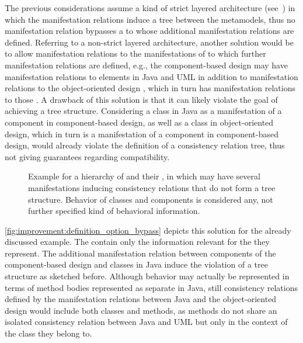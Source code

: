 The previous considerations assume a kind of strict layered architecture (see~\cite{buschmann1996PatternsArchitecture-Book}) in which the manifestation relations induce a tree between the metamodels, thus no manifestation relation bypasses a \conceptmetamodel to whose \commonalities additional manifestation relations are defined.
Referring to a non-strict layered architecture, another solution would be to allow manifestation relations to the manifestations of \conceptmetamodels to which further manifestation relations are defined, e.g., the component-based design \commonalities may have manifestation relations to elements in Java and \gls{UML} in addition to manifestation relations to the object-oriented design \conceptmetamodels, which in turn has manifestation relations to those \concretemetamodels.
A drawback of this solution is that it can likely violate the goal of achieving a tree structure.
Considering a class in Java as a manifestation of a component in component-based design, as well as a class in object-oriented design, which in turn is a manifestation of a component in component-based design, would already violate the definition of a consistency relation tree, thus not giving guarantees regarding compatibility.

\begin{figure}
    \centering
    
    \caption[\Commonalities with multiple manifestations]{Example for a hierarchy of \conceptmetamodels and their \commonalities, in which \commonalities may have several manifestations inducing consistency relations that do not form a tree structure. Behavior of classes and components is considered any, not further specified kind of behavioral information.}
    \label{fig:improvement:definition_option_bypass}
\end{figure}

\autoref{fig:improvement:definition_option_bypass} depicts this solution for the already discussed example.
The \conceptmetamodels contain only the information relevant for the \commonalities they represent.
The additional manifestation relation between components of the component-based design \conceptmetamodel and classes in Java induce the violation of a tree structure as sketched before.
Although behavior may actually be represented in terms of method bodies represented as separate \metaclasses in Java, still consistency relations defined by the manifestation relations between Java and the object-oriented design \conceptmetamodel would include both classes and methods, as methods do not share an isolated consistency relation between Java and \gls{UML} but only in the context of the class they belong to.


